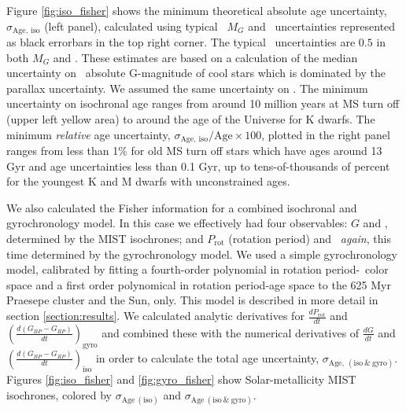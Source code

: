 Figure \ref{fig:iso_fisher} shows the minimum theoretical absolute age
uncertainty, $\sigma_{\mathrm{Age,~iso}}$ (left panel), calculated using
typical \Gaia\ $M_G$ and \gcolor\ uncertainties represented as black errorbars
in the top right corner.
The typical \Gaia\ uncertainties are $0.5$ in both $M_G$ and \gcolor.
These estimates are based on a calculation of the median uncertainty on \Gaia\
absolute G-magnitude of cool stars which is dominated by the parallax
uncertainty.
We assumed the same uncertainty on \gcolor.
The minimum uncertainty on isochronal age ranges from around 10 million years
at MS turn off (upper left yellow area) to around the age of the Universe for
K dwarfs.
The minimum {\it relative} age uncertainty,
$\sigma_{\mathrm{Age,~iso}}/\mathrm{Age} \times 100$, plotted in the right
panel ranges from less than 1\% for old MS turn off stars which have ages
around 13 Gyr and age uncertainties less than 0.1 Gyr, up to tens-of-thousands
of percent for the youngest K and M dwarfs with unconstrained ages.

We also calculated the Fisher information for a combined isochronal and
gyrochronology model.
In this case we effectively had four observables: $G$ and \gcolor, determined
by the MIST isochrones; and $P_{\mathrm{rot}}$ (rotation period) and \gcolor\
{\it again}, this time determined by the gyrochronology model.
We used a simple gyrochronology model, calibrated by fitting a fourth-order
polynomial in rotation period-\Gaia\ color space and a first order polynomical
in rotation period-age space to the 625 Myr Praesepe cluster and the Sun,
only.
This model is described in more detail in section \ref{section:results}.
We calculated analytic derivatives for $\frac{dP_{\mathrm{rot}}}{dt}$ and
$\left(\frac{d(G_{BP} - G_{RP})}{dt}\right)_{\mathrm{gyro}}$ and combined
these with the numerical derivatives of $\frac{dG}{dt}$ and
$\left(\frac{d(G_{BP} - G_{RP})}{dt}\right)_{\mathrm{iso}}$ in order to
calculate the total age uncertainty, $\sigma_{\mathrm{Age,~(iso~\&~gyro)}}$.
Figures \ref{fig:iso_fisher} and \ref{fig:gyro_fisher} show Solar-metallicity
MIST isochrones, colored by $\sigma_{\mathrm{Age~(iso)}}$ and
$\sigma_{\mathrm{Age~(iso~\&~gyro)}}$.

